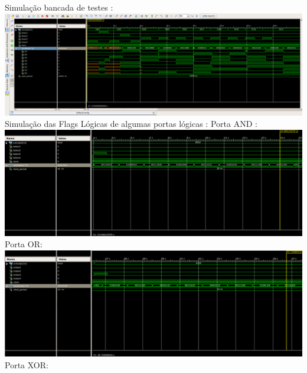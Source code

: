 \documentclass[11pt]{book}
\begin{document}
\newline\newline
Simulação bancada de testes : 
\newline\newline
\includegraphics[width=1.1\textwidth]{Simulacao_Bancada_de_Testes.png}%
\newline\newline
Simulação das Flags Lógicas de algumas portas lógicas : 
\newline\newline
Porta AND :
\newline\newline
\includegraphics[width=1.1\textwidth]{Porta_AND.png}%
\newline\newline
 Porta OR:
\newline\newline
\includegraphics[width=1.1\textwidth]{Porta_OR.png}%
\newline\newline
Porta XOR:
\newline\newline
\end{document}
